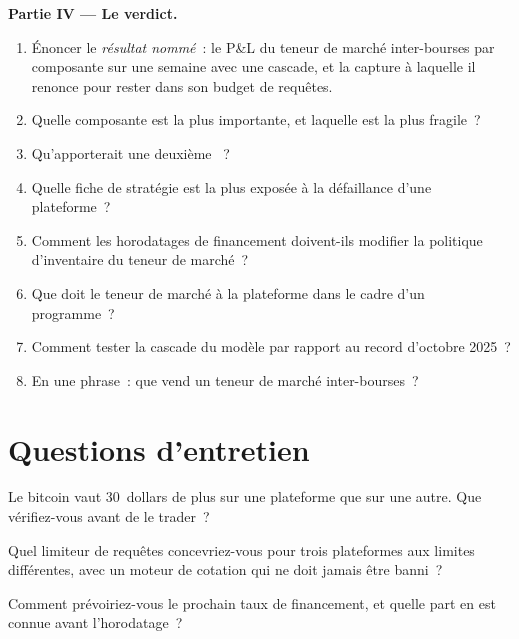 \begin{problem}
\medskip\noindent\textbf{Partie IV --- Le verdict.}
\begin{enumerate}[resume]
\item Énoncer le \emph{résultat nommé}~: le P\&L du teneur de marché inter-bourses par composante sur une semaine avec une cascade, et la capture à laquelle il renonce pour rester
dans son budget de requêtes.
\item Quelle composante est la plus importante, et laquelle est la plus fragile~?
\item Qu'apporterait une deuxième ~?
\item Quelle fiche de stratégie est la plus exposée à la défaillance d'une plateforme~?
\item Comment les horodatages de financement doivent-ils modifier la politique d'inventaire du teneur de marché~?
\item Que doit le teneur de marché à la plateforme dans le cadre d'un programme~?
\item Comment tester la cascade du modèle par rapport au record d'octobre 2025~?
\item En une phrase~: que vend un teneur de marché inter-bourses~?
\end{enumerate}
\end{problem}

\section{Questions d'entretien}

\begin{interviewq}\label{iq:hf:crypto-high-frequency-trading-on-centralised-venues:1}
Le bitcoin vaut 30~dollars de plus sur une plateforme que sur une autre. Que vérifiez-vous avant de le trader~?
\end{interviewq}

\begin{interviewq}\label{iq:hf:crypto-high-frequency-trading-on-centralised-venues:2}
Quel limiteur de requêtes concevriez-vous pour trois plateformes aux limites différentes, avec un moteur de cotation qui ne doit jamais être banni~?
\end{interviewq}

\begin{interviewq}\label{iq:hf:crypto-high-frequency-trading-on-centralised-venues:3}
Comment prévoiriez-vous le prochain taux de financement, et quelle part en est connue avant l'horodatage~?
\end{interviewq}

